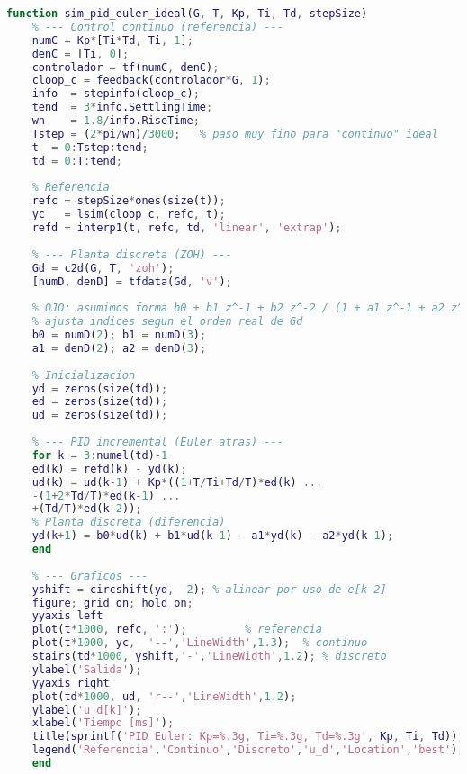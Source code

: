 \begin{lstlisting}[language=Matlab,style=matlabstyle, caption={Simulacion PID incremental (Euler) vs continuo}, label={lst:pid_euler_ideal}]
	function sim_pid_euler_ideal(G, T, Kp, Ti, Td, stepSize)
	% --- Control continuo (referencia) ---
	numC = Kp*[Ti*Td, Ti, 1];
	denC = [Ti, 0];
	controlador = tf(numC, denC);
	cloop_c = feedback(controlador*G, 1);
	info  = stepinfo(cloop_c);
	tend  = 3*info.SettlingTime;
	wn    = 1.8/info.RiseTime;
	Tstep = (2*pi/wn)/3000;   % paso muy fino para "continuo" ideal
	t  = 0:Tstep:tend;
	td = 0:T:tend;
	
	% Referencia
	refc = stepSize*ones(size(t));
	yc   = lsim(cloop_c, refc, t);
	refd = interp1(t, refc, td, 'linear', 'extrap');
	
	% --- Planta discreta (ZOH) ---
	Gd = c2d(G, T, 'zoh');
	[numD, denD] = tfdata(Gd, 'v');
	
	% OJO: asumimos forma b0 + b1 z^-1 + b2 z^-2 / (1 + a1 z^-1 + a2 z^-2)
	% ajusta indices segun el orden real de Gd
	b0 = numD(2); b1 = numD(3);
	a1 = denD(2); a2 = denD(3);
	
	% Inicializacion
	yd = zeros(size(td));
	ed = zeros(size(td));
	ud = zeros(size(td));
	
	% --- PID incremental (Euler atras) ---
	for k = 3:numel(td)-1
	ed(k) = refd(k) - yd(k);
	ud(k) = ud(k-1) + Kp*((1+T/Ti+Td/T)*ed(k) ...
	-(1+2*Td/T)*ed(k-1) ...
	+(Td/T)*ed(k-2));
	% Planta discreta (diferencia)
	yd(k+1) = b0*ud(k) + b1*ud(k-1) - a1*yd(k) - a2*yd(k-1);
	end
	
	% --- Graficos ---
	yshift = circshift(yd, -2); % alinear por uso de e[k-2]
	figure; grid on; hold on;
	yyaxis left
	plot(t*1000, refc, ':');         % referencia
	plot(t*1000, yc,  '--','LineWidth',1.3);  % continuo
	stairs(td*1000, yshift,'-','LineWidth',1.2); % discreto
	ylabel('Salida');
	yyaxis right
	plot(td*1000, ud, 'r--','LineWidth',1.2);
	ylabel('u_d[k]');
	xlabel('Tiempo [ms]');
	title(sprintf('PID Euler: Kp=%.3g, Ti=%.3g, Td=%.3g', Kp, Ti, Td));
	legend('Referencia','Continuo','Discreto','u_d','Location','best');
	end
\end{lstlisting}


